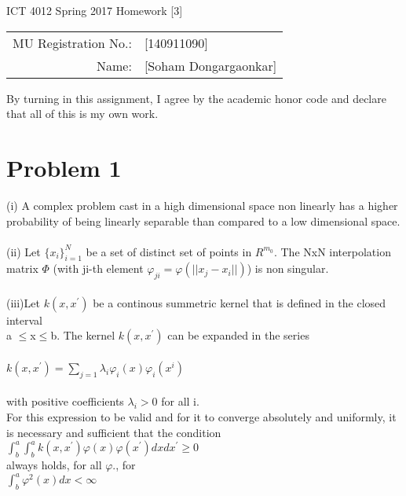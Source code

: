 \documentclass[12pt]{article}
\begin{document}
\begin{center}
{\Large ICT 4012 Spring 2017 Homework [3]} %

\begin{tabular}{rl}
MU Registration No.: & [140911090] \\  %
Name: & [Soham Dongargaonkar] \\   %
\end{tabular}
\end{center}

By turning in this assignment, I agree by the academic honor code and declare that all of this is my own work.

\section*{Problem 1}

\begin{center}
    {(i) A complex problem cast in a high dimensional space non linearly has a higher probability of being linearly separable than compared to a low dimensional space.\\ 
    \text{}\\
    (ii) Let ${\{x_i \}}_{i=1}^{N}$ be a set of distinct set of points in $R^{m_{0}}$. The NxN interpolation matrix $\Phi$ (with ji-th element $\varphi_{ji}=\varphi(||x_j-x_i||)$) is non singular.}\\\text{}\\
    (iii)Let $k(x,x^{'})$ be a continous summetric kernel that is defined in the closed interval \\a $\leq$x$ \leq$b. The kernel $k(x,x^{'})$ can be expanded in the series\\\text{}\\
    $k(x,x^{'}) = \sum_{j=1}{\lambda_{i}\varphi_{i}(x)\varphi_{i}(x^{i})}$\\\text{}\\
    with positive coefficients $\lambda_{i}>0$ for all i.\\
    For this expression to be valid and for it to converge absolutely and uniformly, it is necessary and sufficient that the condition \\
    
    $\int_{b}^{a}\int_{b}^{a}k(x,x^{'}) \varphi(x)\varphi(x^{'})dxdx^{'} \geq{0}$ \\
    always holds, for all $\varphi{.}$, for\\
    $\int_{b}^{a}\varphi^{2}(x)dx < \infty$
    
\end{center}
\end{document}
